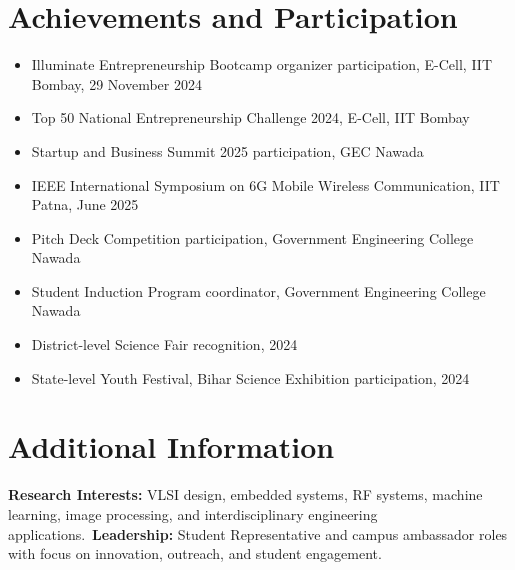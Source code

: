 \documentclass[11pt,a4paper]{article}
\begin{document}
\section*{Achievements and Participation}
\begin{itemize}
    \item Illuminate Entrepreneurship Bootcamp organizer participation, E-Cell, IIT Bombay, 29 November 2024
    \item Top 50 National Entrepreneurship Challenge 2024, E-Cell, IIT Bombay
    \item Startup and Business Summit 2025 participation, GEC Nawada
    \item IEEE International Symposium on 6G Mobile Wireless Communication, IIT Patna, June 2025
    \item Pitch Deck Competition participation, Government Engineering College Nawada
    \item Student Induction Program coordinator, Government Engineering College Nawada
    \item District-level Science Fair recognition, 2024
    \item State-level Youth Festival, Bihar Science Exhibition participation, 2024
\end{itemize}

\section*{Additional Information}
\textbf{Research Interests:} VLSI design, embedded systems, RF systems, machine learning, image processing, and interdisciplinary engineering applications.\
\textbf{Leadership:} Student Representative and campus ambassador roles with focus on innovation, outreach, and student engagement.
\end{document}

